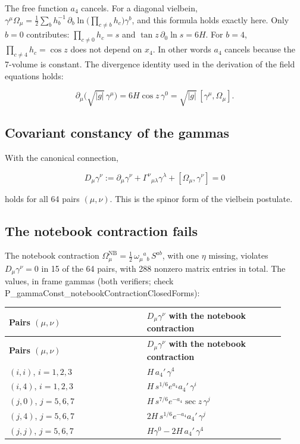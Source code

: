 \documentclass[11pt]{article}
\begin{document}
The free function $a_4$ cancels. For a diagonal vielbein, $\gamma^\mu\Omega_\mu=\tfrac12\sum_b h_b^{-1}\,\partial_b\ln\bigl(\prod_{c\ne b}h_c\bigr)\gamma^b$, and this formula holds exactly here. Only $b=0$ contributes: $\prod_{c\ne0}h_c=s$ and $\tan z\,\partial_0\ln s=6H$. For $b=4$, $\prod_{c\ne4}h_c=\cos z$ does not depend on $x_4$. In other words $a_4$ cancels because the 7-volume is constant. The divergence identity used in the derivation of the field equations holds:

\[
\partial_\mu\bigl(\sqrt{|g|}\,\gamma^\mu\bigr)=6H\cos z\,\gamma^0=\sqrt{|g|}\,[\gamma^\mu,\Omega_\mu].
\]

\subsection{Covariant constancy of the gammas}

With the canonical connection,

\[
D_\mu\gamma^\nu:=\partial_\mu\gamma^\nu+\Gamma^\nu{}_{\mu\lambda}\gamma^\lambda+[\Omega_\mu,\gamma^\nu]=0
\]

holds for all 64 pairs $(\mu,\nu)$. This is the spinor form of the vielbein postulate.

\subsection{The notebook contraction fails}

The notebook contraction $\Omega^{\mathrm{NB}}_\mu=\tfrac12\,\omega_\mu{}^a{}_b\,S^{ab}$, with one $\eta$ missing, violates $D_\mu\gamma^\nu=0$ in 15 of the 64 pairs, with 288 nonzero matrix entries in total. The values, in frame gammas (both verifiers; check P\_gammaConst\_notebookContractionClosedForms):

\begin{longtable}{@{}p{0.460\linewidth}p{0.460\linewidth}@{}}
\toprule
\textbf{Pairs $(\mu,\nu)$} & \textbf{$D_\mu\gamma^\nu$ with the notebook contraction} \\
\midrule
\endfirsthead
\toprule
\textbf{Pairs $(\mu,\nu)$} & \textbf{$D_\mu\gamma^\nu$ with the notebook contraction} \\
\midrule
\endhead
$(i,i)$, $i=1,2,3$ & $H\,a_4'\,\gamma^4$ \\
$(i,4)$, $i=1,2,3$ & $H\,s^{1/6}e^{a_4}a_4'\,\gamma^i$ \\
$(j,0)$, $j=5,6,7$ & $H\,s^{7/6}e^{-a_4}\sec z\,\gamma^j$ \\
$(j,4)$, $j=5,6,7$ & $2H\,s^{1/6}e^{-a_4}a_4'\,\gamma^j$ \\
$(j,j)$, $j=5,6,7$ & $H\gamma^0-2H\,a_4'\,\gamma^4$ \\
\bottomrule
\end{longtable}
\end{document}
